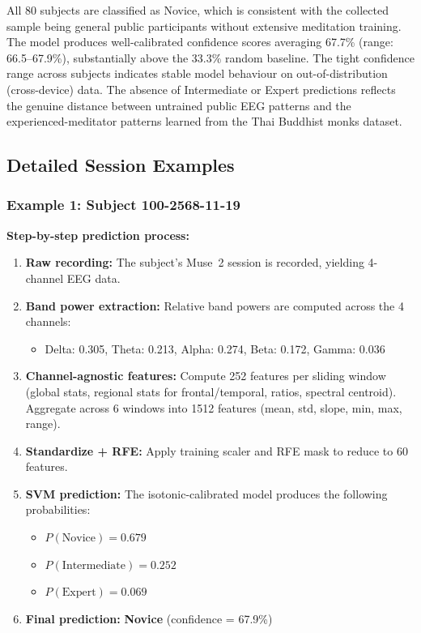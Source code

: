 \documentclass[12pt,a4paper]{article}
\begin{document}
All 80 subjects are classified as Novice, which is consistent with the collected sample being general public participants without extensive meditation training. The model produces well-calibrated confidence scores averaging 67.7\% (range: 66.5--67.9\%), substantially above the 33.3\% random baseline. The tight confidence range across subjects indicates stable model behaviour on out-of-distribution (cross-device) data. The absence of Intermediate or Expert predictions reflects the genuine distance between untrained public EEG patterns and the experienced-meditator patterns learned from the Thai Buddhist monks dataset.

\subsection{Detailed Session Examples}

\subsubsection{Example 1: Subject 100-2568-11-19}

\textbf{Step-by-step prediction process:}

\begin{enumerate}
  \item \textbf{Raw recording:} The subject's Muse~2 session is recorded, yielding 4-channel EEG data.
  \item \textbf{Band power extraction:} Relative band powers are computed across the 4 channels:
  \begin{itemize}
    \item Delta: 0.305, Theta: 0.213, Alpha: 0.274, Beta: 0.172, Gamma: 0.036
  \end{itemize}
  \item \textbf{Channel-agnostic features:} Compute 252 features per sliding window (global stats, regional stats for frontal/temporal, ratios, spectral centroid). Aggregate across 6 windows into 1512 features (mean, std, slope, min, max, range).
  \item \textbf{Standardize + RFE:} Apply training scaler and RFE mask to reduce to 60 features.
  \item \textbf{SVM prediction:} The isotonic-calibrated model produces the following probabilities:
  \begin{itemize}
    \item $P(\text{Novice}) = 0.679$
    \item $P(\text{Intermediate}) = 0.252$
    \item $P(\text{Expert}) = 0.069$
  \end{itemize}
  \item \textbf{Final prediction:} \textbf{Novice} (confidence = 67.9\%)
\end{enumerate}
\end{document}

